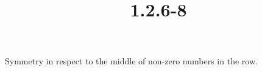 \documentclass{article}
\title{1.2.6-8}
\begin{document}
\maketitle

Symmetry in respect to the middle of non-zero numbers in the row.
\end{document}
